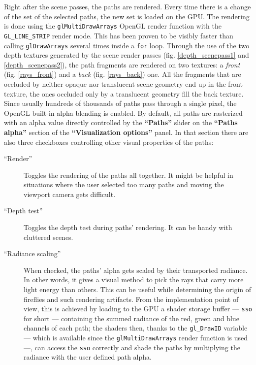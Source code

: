 Right after the scene passes, the paths are rendered. Every time there is a change of the set of the selected paths, the new set is loaded on the GPU. The rendering is done using the \texttt{glMultiDrawArrays} OpenGL render function with the \texttt{GL\_LINE\_STRIP} render mode. This has been proven to be visibly faster than calling \texttt{glDrawArrays} several times inside a \texttt{for} loop. Through the use of the two depth textures generated by the scene render passes (fig. \ref{depth_scenepass1} and \ref{depth_scenepass2}), the path fragments are rendered on two textures: a \textit{front} (fig. \ref{rays_front}) and a \textit{back} (fig. \ref{rays_back}) one. All the fragments that are occluded by neither opaque nor translucent scene geometry end up in the front texture, the ones occluded only by a translucent geometry fill the back texture. Since usually hundreds of thousands of paths pass through a single pixel, the OpenGL built-in alpha blending is enabled. By default, all paths are rasterized with an alpha value directly controlled by the \textbf{“Paths”} slider on the \textbf{“Paths alpha”}  section of the \textbf{“Visualization options”} panel. In that section there are also three checkboxes controlling other visual properties of the paths:
\begin{description}
	\item[“Render”] Toggles the rendering of the paths all together. It might be helpful in situations where the user selected too many paths and moving the viewport camera gets difficult.
	\item[“Depth test”] Toggles the depth test during paths' rendering. It can be handy with cluttered scenes.
	\item[“Radiance scaling”] When checked, the paths' alpha gets scaled by their transported radiance. In other words, it gives a visual method to pick the rays that carry more light energy than others. This can be useful while determining the origin of fireflies and such rendering artifacts. From the implementation point of view, this is achieved by loading to the GPU a shader storage buffer --- \texttt{sso} for short --- containing the summed radiance of the red, green and blue channels of each path; the shaders then, thanks to the \texttt{gl\_DrawID} variable --- which is available since the \texttt{glMultiDrawArrays} render function is used ---, can access the \texttt{sso} correctly and shade the paths by multiplying the radiance with the user defined path alpha.
\end{description}

